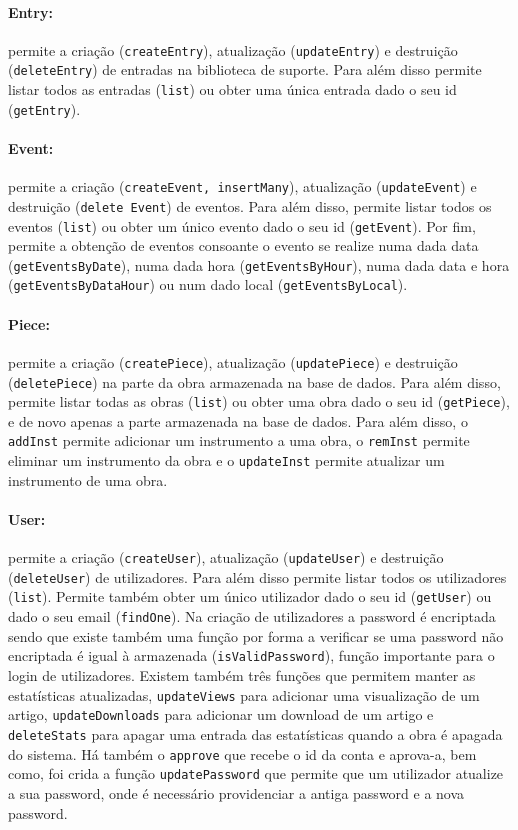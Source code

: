 \paragraph{Entry:} permite a criação (\texttt{createEntry}), atualização (\texttt{updateEntry}) e destruição (\texttt{deleteEntry}) de entradas na biblioteca de suporte. Para além disso permite listar todos as entradas (\texttt{list}) ou obter uma única entrada dado o seu id (\texttt{getEntry}).
    
\paragraph{Event:} permite a criação (\texttt{createEvent, insertMany}), atualização (\texttt{updateEvent}) e destruição (\texttt{delete Event}) de eventos. Para além disso, permite listar todos os eventos (\texttt{list}) ou obter um único evento dado o seu id (\texttt{getEvent}). Por fim, permite a obtenção de eventos consoante o evento se realize numa dada data (\texttt{getEventsByDate}), numa dada hora (\texttt{getEventsByHour}), numa dada data e hora (\texttt{getEventsByDataHour}) ou num dado local (\texttt{getEventsByLocal}).

\paragraph{Piece:} permite a criação (\texttt{createPiece}), atualização (\texttt{updatePiece}) e destruição (\texttt{deletePiece}) na parte da obra armazenada na base de dados. Para além disso, permite listar todas as obras (\texttt{list}) ou obter uma obra dado o seu id (\texttt{getPiece}), e de novo apenas a parte armazenada na base de dados. Para além disso, o \texttt{addInst} permite adicionar um instrumento a uma obra, o \texttt{remInst} permite eliminar um instrumento da obra e o \texttt{updateInst} permite atualizar um instrumento de uma obra.
    
\paragraph{User:} permite a criação (\texttt{createUser}), atualização (\texttt{updateUser}) e destruição (\texttt{deleteUser}) de utilizadores. Para além disso permite listar todos os utilizadores (\texttt{list}). Permite também obter um único utilizador dado o seu id (\texttt{getUser}) ou dado o seu email (\texttt{findOne}). Na criação de utilizadores a password é encriptada sendo que existe também uma função por forma a verificar se uma password não encriptada é igual à armazenada (\texttt{isValidPassword}), função importante para o login de utilizadores.  Existem também três funções que permitem manter as estatísticas atualizadas, \texttt{updateViews} para adicionar uma visualização de um artigo, \texttt{updateDownloads} para adicionar um download de um artigo e \texttt{deleteStats} para apagar uma entrada das estatísticas quando a obra é apagada do sistema. Há também o \texttt{approve} que recebe o id da conta e aprova-a, bem como, foi crida a função \texttt{updatePassword} que permite que um utilizador atualize a sua password, onde é necessário providenciar a antiga password e a nova password.

